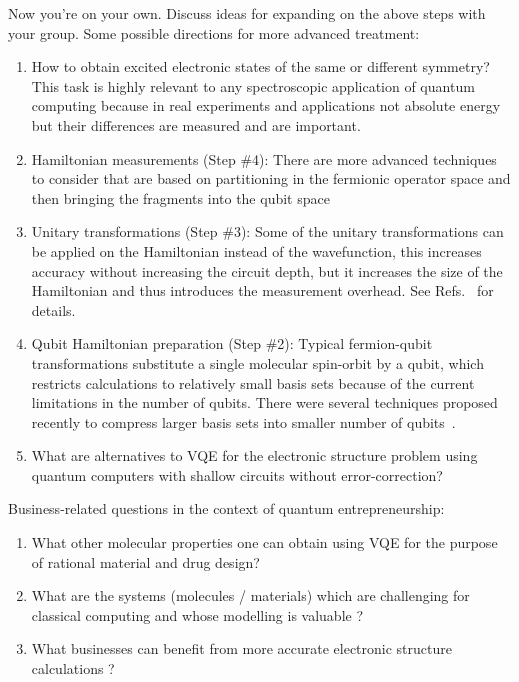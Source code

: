 \documentclass[12pt]{article}
\begin{document}
Now you're on your own.  Discuss ideas for expanding on the above steps with your group.  Some possible directions for more advanced treatment:
\begin{enumerate}
\item How to obtain excited electronic states of the same or different symmetry? This task is highly relevant to any spectroscopic 
application of quantum computing because in real experiments and applications not absolute energy but their differences are measured and are important.  

\item Hamiltonian measurements (Step \#4): There are more advanced techniques to consider that are based on partitioning in the fermionic operator space and then bringing the fragments into the qubit space~\cite{huggins2019efficient}%

\item Unitary transformations (Step \#3): Some of the unitary transformations can be applied on the Hamiltonian instead of the wavefunction, this increases 
accuracy without increasing the circuit depth, but it increases the size of the Hamiltonian and thus introduces the measurement overhead. 
See Refs.~\cite{Ryabinkin2019b,Lang:2020uv} for details. 

\item Qubit Hamiltonian preparation (Step \#2): Typical fermion-qubit transformations substitute a single molecular spin-orbit by a qubit, which restricts calculations to relatively small basis sets because of the current limitations in the number of qubits. There were several techniques proposed recently to 
compress larger basis sets into smaller number of qubits~\cite{Takeshita:2019wn,Bauman2019b}.

\item What are alternatives to VQE for the electronic structure problem using quantum computers with shallow circuits without error-correction?
  
\end{enumerate}

Business-related questions in the context of quantum entrepreneurship:

\begin{enumerate}
\item What other molecular properties one can obtain using VQE for the purpose of rational material and drug design?
\item What are the systems (molecules / materials) which are challenging for classical computing and whose modelling is valuable ?
\item What businesses can benefit from more accurate electronic structure calculations ?
\end{enumerate}



\end{document}
